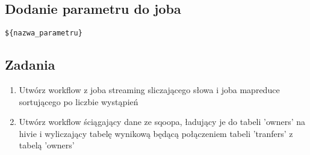 \documentclass[11pt]{article}
\begin{document}
\subsection*{Dodanie parametru do joba}
\begin{lstlisting}
${nazwa_parametru}
\end{lstlisting}

\pagebreak
\subsection*{Zadania}
\begin{enumerate}
\item Utwórz workflow z joba streaming sliczającego słowa i joba mapreduce sortującego po liczbie wystąpień
\item Utwórz workflow ściągający dane ze sqoopa, ładujący je do tabeli 'owners' na hivie i wyliczający tabelę wynikową będącą połączeniem tabeli 'tranfers' z tabelą 'owners'
\end{enumerate}
\end{document}
